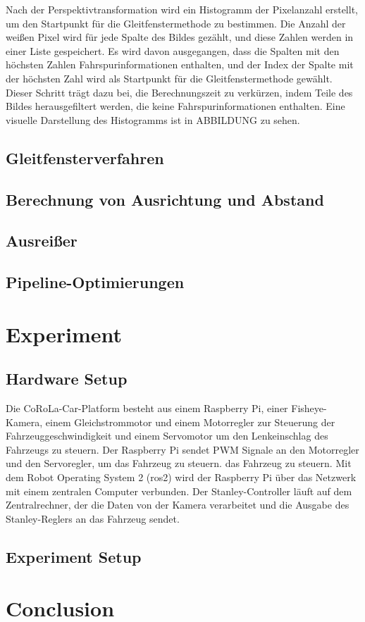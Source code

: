 \documentclass[arbeit=studie,oneside,BCOR=12mm]{ArbeitRST}
\begin{document}
Nach der Perspektivtransformation wird ein Histogramm der Pixelanzahl erstellt,
um den Startpunkt für die Gleitfenstermethode zu bestimmen. Die Anzahl der
weißen Pixel wird für jede Spalte des Bildes gezählt, und diese Zahlen werden
in einer Liste gespeichert. Es wird davon ausgegangen, dass die Spalten mit den
höchsten Zahlen Fahrspurinformationen enthalten, und der Index der Spalte mit
der höchsten Zahl wird als Startpunkt für die Gleitfenstermethode gewählt.
Dieser Schritt trägt dazu bei, die Berechnungszeit zu verkürzen, indem Teile
des Bildes herausgefiltert werden, die keine Fahrspurinformationen enthalten.
Eine visuelle Darstellung des Histogramms ist in ABBILDUNG zu sehen.

\section{Gleitfensterverfahren}
\section{Berechnung von Ausrichtung und Abstand}
\section{Ausrei{\ss}er}
\section{Pipeline-Optimierungen}

\chapter{Experiment}
\section{Hardware Setup}

Die CoRoLa-Car-Platform besteht aus einem Raspberry Pi, einer Fisheye-Kamera,
einem Gleichstrommotor und einem Motorregler zur Steuerung der
Fahrzeuggeschwindigkeit und einem Servomotor um den Lenkeinschlag des Fahrzeugs
zu steuern. Der Raspberry Pi sendet PWM Signale an den Motorregler und den
Servoregler, um das Fahrzeug zu steuern. das Fahrzeug zu steuern. Mit dem Robot
Operating System 2 (ros2) wird der Raspberry Pi über das Netzwerk mit einem
zentralen Computer verbunden. Der Stanley-Controller läuft auf dem
Zentralrechner, der die Daten von der Kamera verarbeitet und die Ausgabe des
Stanley-Reglers an das Fahrzeug sendet.

\section{Experiment Setup}


\chapter{Conclusion}
\end{document}
